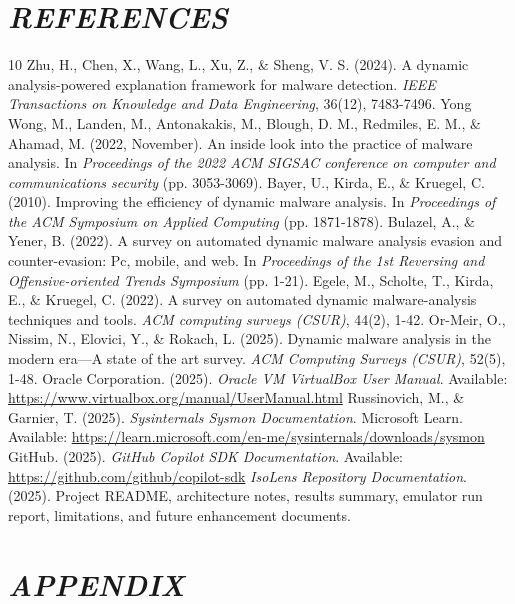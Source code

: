\documentclass[a4paper,12pt,oneside]{report}
\begin{document}
\chapter*{\textit{REFERENCES}}
\begin{thebibliography}{10}
 Zhu, H., Chen, X., Wang, L., Xu, Z., \& Sheng, V. S. (2024). A dynamic analysis-powered explanation framework for malware detection. \textit{IEEE Transactions on Knowledge and Data Engineering}, 36(12), 7483-7496.
 Yong Wong, M., Landen, M., Antonakakis, M., Blough, D. M., Redmiles, E. M., \& Ahamad, M. (2022, November). An inside look into the practice of malware analysis. In \textit{Proceedings of the 2022 ACM SIGSAC conference on computer and communications security} (pp. 3053-3069).
 Bayer, U., Kirda, E., \& Kruegel, C. (2010). Improving the efficiency of dynamic malware analysis. In \textit{Proceedings of the ACM Symposium on Applied Computing} (pp. 1871-1878).
 Bulazel, A., \& Yener, B. (2022). A survey on automated dynamic malware analysis evasion and counter-evasion: Pc, mobile, and web. In \textit{Proceedings of the 1st Reversing and Offensive-oriented Trends Symposium} (pp. 1-21).
 Egele, M., Scholte, T., Kirda, E., \& Kruegel, C. (2022). A survey on automated dynamic malware-analysis techniques and tools. \textit{ACM computing surveys (CSUR)}, 44(2), 1-42.
 Or-Meir, O., Nissim, N., Elovici, Y., \& Rokach, L. (2025). Dynamic malware analysis in the modern era---A state of the art survey. \textit{ACM Computing Surveys (CSUR)}, 52(5), 1-48.
 Oracle Corporation. (2025). \textit{Oracle VM VirtualBox User Manual}. Available: \url{https://www.virtualbox.org/manual/UserManual.html}
 Russinovich, M., \& Garnier, T. (2025). \textit{Sysinternals Sysmon Documentation}. Microsoft Learn. Available: \url{https://learn.microsoft.com/en-me/sysinternals/downloads/sysmon}
 GitHub. (2025). \textit{GitHub Copilot SDK Documentation}. Available: \url{https://github.com/github/copilot-sdk}
 \textit{IsoLens Repository Documentation}. (2025). Project README, architecture notes, results summary, emulator run report, limitations, and future enhancement documents.
\end{thebibliography}

\chapter*{\textit{APPENDIX}}
\setcounter{figure}{0}
\renewcommand{\thefigure}{A.\arabic{figure}}
\end{document}
